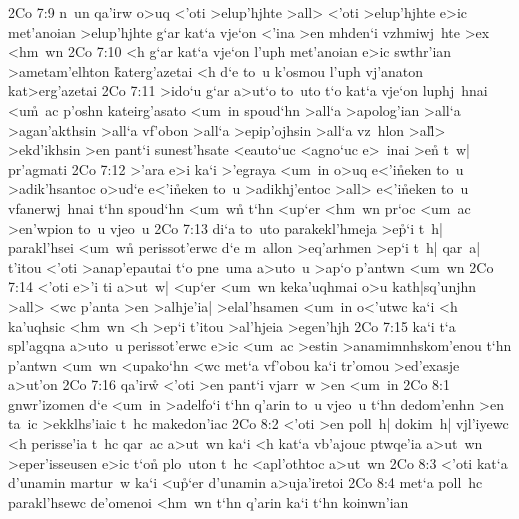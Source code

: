 \vs 2Co 7:9
n~un
qa'irw
o>uq
<'oti
>elup'hjhte
>all>
<'oti
>elup'hjhte
e>ic
met'anoian
>elup'hjhte
g`ar
kat`a
vje`on
<'ina
>en
mhden`i
vzhmiwj~hte
>ex
<hm~wn\bibvsend
\vs 2Co 7:10
<h
g`ar
kat`a
vje`on
l'uph
met'anoian
e>ic
swthr'ian
>ametam'elhton
\r{k}aterg'azetai
<h
d`e
to~u
k'osmou
l'uph
vj'anaton
kat>erg'azetai\bibvsend
\vs 2Co 7:11
>ido`u
g`ar
a>ut`o
to~uto
t`o
kat`a
vje`on
luphj~hnai
<u\r{m}~ac
p'oshn
kateirg'asato
<um~in
spoud`hn
>all`a
>apolog'ian
>all`a
>agan'akthsin
>all`a
vf'obon
>all`a
>epip'ojhsin
>all`a
vz~hlon
>al\r{l}>
>ekd'ikhsin
>en
pant`i
sunest'hsate
<eauto`uc
<agno`uc
e>~inai
>e\r{n}
t~w|
pr'agmati\bibvsend
\vs 2Co 7:12
>'ara
e>i
ka`i
>'egraya
<um~in
o>uq
e<'i\r{n}eken
to~u
>adik'hsantoc
o>ud`e
e<'i\r{n}eken
to~u
>adikhj'entoc
>all>
e<'i\r{n}eken
to~u
vfanerwj~hnai
t`hn
spoud`hn
<um~wn\r{}
t`hn
<up`er
<hm~wn
pr`oc
<um~ac
>en'wpion
to~u
vjeo~u\bibvsend
\vs 2Co 7:13
di`a
to~uto
parakekl'hmeja
>e\r{p}`i
t~h|
parakl'hsei
<um~wn\r{}
perissot'erwc
d`e
m~allon
>eq'arhmen
>ep`i
t~h|
qar~a|
t'itou
<'oti
>anap'epautai
t`o
pne~uma
a>uto~u
>ap`o
p'antwn
<um~wn\bibvsend
\vs 2Co 7:14
<'oti
e>'i
ti
a>ut~w|
<up`er
<um~wn
keka'uqhmai
o>u
kath|sq'unjhn
>all>
<wc
p'anta
>en
>alhje'ia|
>elal'hsamen
<um~in
o<'utwc
ka`i
<h
ka'uqhsic
<hm~wn
<h
>ep`i
t'itou
>al'hjeia
>egen'hjh\bibvsend
\vs 2Co 7:15
ka`i
t`a
spl'agqna
a>uto~u
perissot'erwc
e>ic
<um~ac
>estin
>anamimnhskom'enou
t`hn
p'antwn
<um~wn
<upako`hn
<wc
met`a
vf'obou
ka`i
tr'omou
>ed'exasje
a>ut'on\bibvsend
\vs 2Co 7:16
qa'ir\r{w}
<'oti
>en
pant`i
vjarr~w
>en
<um~in\bibvsend
\vs 2Co 8:1
gnwr'izomen
d`e
<um~in
>adelfo`i
t`hn
q'arin
to~u
vjeo~u
t`hn
dedom'enhn
>en
ta~ic
>ekklhs'iaic
t~hc
makedon'iac\bibvsend
\vs 2Co 8:2
<'oti
>en
poll~h|
dokim~h|
vjl'iyewc
<h
perisse'ia
t~hc
qar~ac
a>ut~wn
ka`i
<h
kat`a
vb'ajouc
ptwqe'ia
a>ut~wn
>eper'isseusen
e>ic
t`on\r{}
plo~uton
t~hc
<apl'othtoc
a>ut~wn\bibvsend
\vs 2Co 8:3
<'oti
kat`a
d'unamin
martur~w
ka`i
<u\r{p}`er
d'unamin
a>uja'iretoi\bibvsend
\vs 2Co 8:4
met`a
poll~hc
parakl'hsewc
de'omenoi
<hm~wn
t`hn
q'arin
ka`i
t`hn
koinwn'ian
